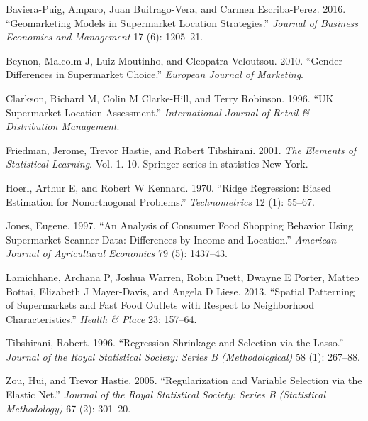 \documentclass[
]{article}
\begin{document}
\hypertarget{refs}{}
\leavevmode\hypertarget{ref-baviera2016geomarketing}{}%
Baviera-Puig, Amparo, Juan Buitrago-Vera, and Carmen Escriba-Perez.
2016. ``Geomarketing Models in Supermarket Location Strategies.''
\emph{Journal of Business Economics and Management} 17 (6): 1205--21.

\leavevmode\hypertarget{ref-beynon2010gender}{}%
Beynon, Malcolm J, Luiz Moutinho, and Cleopatra Veloutsou. 2010.
``Gender Differences in Supermarket Choice.'' \emph{European Journal of
Marketing}.

\leavevmode\hypertarget{ref-clarkson1996uk}{}%
Clarkson, Richard M, Colin M Clarke-Hill, and Terry Robinson. 1996. ``UK
Supermarket Location Assessment.'' \emph{International Journal of Retail
\& Distribution Management}.

\leavevmode\hypertarget{ref-friedman2001elements}{}%
Friedman, Jerome, Trevor Hastie, and Robert Tibshirani. 2001. \emph{The
Elements of Statistical Learning}. Vol. 1. 10. Springer series in
statistics New York.

\leavevmode\hypertarget{ref-hoerl1970ridge}{}%
Hoerl, Arthur E, and Robert W Kennard. 1970. ``Ridge Regression: Biased
Estimation for Nonorthogonal Problems.'' \emph{Technometrics} 12 (1):
55--67.

\leavevmode\hypertarget{ref-jones1997analysis}{}%
Jones, Eugene. 1997. ``An Analysis of Consumer Food Shopping Behavior
Using Supermarket Scanner Data: Differences by Income and Location.''
\emph{American Journal of Agricultural Economics} 79 (5): 1437--43.

\leavevmode\hypertarget{ref-lamichhane2013spatial}{}%
Lamichhane, Archana P, Joshua Warren, Robin Puett, Dwayne E Porter,
Matteo Bottai, Elizabeth J Mayer-Davis, and Angela D Liese. 2013.
``Spatial Patterning of Supermarkets and Fast Food Outlets with Respect
to Neighborhood Characteristics.'' \emph{Health \& Place} 23: 157--64.

\leavevmode\hypertarget{ref-tibshirani1996regression}{}%
Tibshirani, Robert. 1996. ``Regression Shrinkage and Selection via the
Lasso.'' \emph{Journal of the Royal Statistical Society: Series B
(Methodological)} 58 (1): 267--88.

\leavevmode\hypertarget{ref-zou2005regularization}{}%
Zou, Hui, and Trevor Hastie. 2005. ``Regularization and Variable
Selection via the Elastic Net.'' \emph{Journal of the Royal Statistical
Society: Series B (Statistical Methodology)} 67 (2): 301--20.
\end{document}
